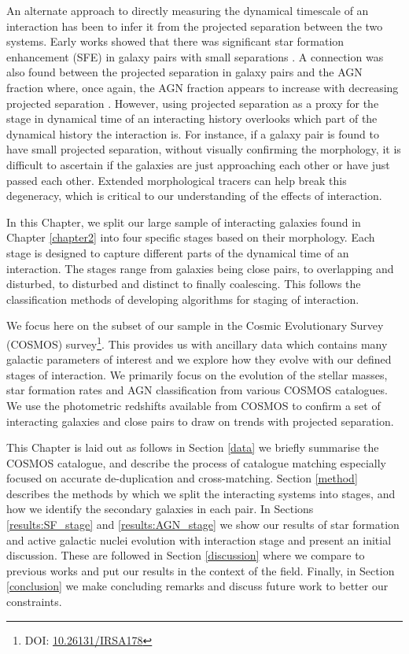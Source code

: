 An alternate approach to directly measuring the dynamical timescale of an interaction has been to infer it from the projected separation between the two systems. Early works showed that there was significant star formation enhancement (SFE) in galaxy pairs with small separations \citep{2003MNRAS.346.1189L,2008MNRAS.385.1903L, 2008AJ....135.1877E, 2022ApJ...940....4S}. A connection was also found between the projected separation in galaxy pairs and the AGN fraction where, once again, the AGN fraction appears to increase with decreasing projected separation \citep{2009MNRAS.399.2172R, 2011MNRAS.418.2043E, 2017MNRAS.465.2671G, 2021ApJ...909..124S}. However, using projected separation as a proxy for the stage in dynamical time of an interacting history overlooks which part of the dynamical history the interaction is. For instance, if a galaxy pair is found to have small projected separation, without visually confirming the morphology, it is difficult to ascertain if the galaxies are just approaching each other or have just passed each other. Extended morphological tracers can help break this degeneracy, which is critical to our understanding of the effects of interaction.

In this Chapter, we split our large sample of interacting galaxies found in Chapter \ref{chapter2} into four specific stages based on their morphology. Each stage is designed to capture different parts of the dynamical time of an interaction. The stages range from galaxies being close pairs, to overlapping and disturbed, to disturbed and distinct to finally coalescing. This follows the classification methods of developing algorithms for staging of interaction\citep{2019MNRAS.490.5390B,2022ApJ...937...97C}. 

We focus here on the subset of our sample in the Cosmic Evolutionary Survey (COSMOS) survey\footnote{DOI: \href{https://www.ipac.caltech.edu/doi/irsa/10.26131/IRSA178}{10.26131/IRSA178}}. This provides us with ancillary data which contains many galactic parameters of interest and we explore how they evolve with our defined stages of interaction. We primarily focus on the evolution of the stellar masses, star formation rates and AGN classification from various COSMOS catalogues. We use the photometric redshifts available from COSMOS to confirm a set of interacting galaxies and close pairs to draw on trends with projected separation.

This Chapter is laid out as follows in Section \ref{data} we briefly summarise the COSMOS catalogue, and describe the process of catalogue matching especially focused on accurate de-duplication and cross-matching. Section \ref{method} describes the methods by which we split the interacting systems into stages, and how we identify the secondary galaxies in each pair. In Sections \ref{results:SF_stage} and \ref{results:AGN_stage} we show our results of star formation and active galactic nuclei evolution with interaction stage and present an initial discussion. These are followed in Section \ref{discussion} where we compare to previous works and put our results in the context of the field. Finally, in Section \ref{conclusion} we make concluding remarks and discuss future work to better our constraints. 

